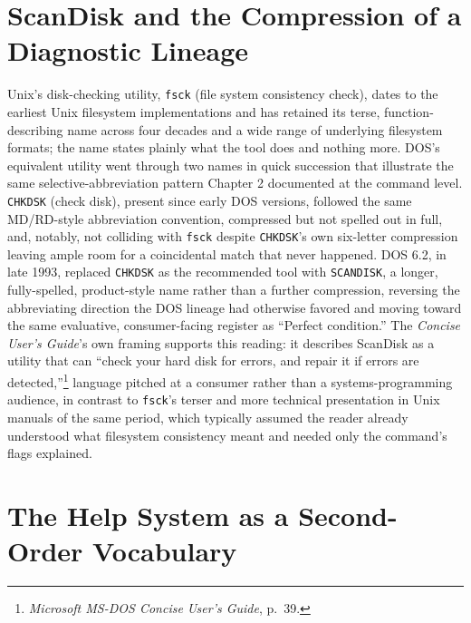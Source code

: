 \documentclass[11pt]{book}
\begin{document}
\section{ScanDisk and the Compression of a Diagnostic Lineage}

Unix's disk-checking utility, \texttt{fsck} (file system consistency check), dates to the earliest Unix filesystem implementations and has retained its terse, function-describing name across four decades and a wide range of underlying filesystem formats; the name states plainly what the tool does and nothing more. DOS's equivalent utility went through two names in quick succession that illustrate the same selective-abbreviation pattern Chapter 2 documented at the command level. \texttt{CHKDSK} (check disk), present since early DOS versions, followed the same MD/RD-style abbreviation convention, compressed but not spelled out in full, and, notably, not colliding with \texttt{fsck} despite \texttt{CHKDSK}'s own six-letter compression leaving ample room for a coincidental match that never happened. DOS 6.2, in late 1993, replaced \texttt{CHKDSK} as the recommended tool with \texttt{SCANDISK}, a longer, fully-spelled, product-style name rather than a further compression, reversing the abbreviating direction the DOS lineage had otherwise favored and moving toward the same evaluative, consumer-facing register as \enquote{Perfect condition.} The \emph{Concise User's Guide}'s own framing supports this reading: it describes ScanDisk as a utility that can \enquote{check your hard disk for errors, and repair it if errors are detected,}\footnote{\emph{Microsoft MS-DOS Concise User's Guide}, p.\ 39.} language pitched at a consumer rather than a systems-programming audience, in contrast to \texttt{fsck}'s terser and more technical presentation in Unix manuals of the same period, which typically assumed the reader already understood what filesystem consistency meant and needed only the command's flags explained.

\section{The Help System as a Second-Order Vocabulary}
\end{document}
